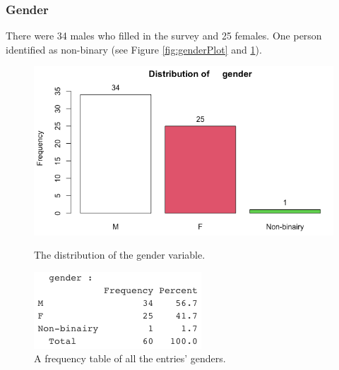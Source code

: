\subsubsection{Gender}
There were 34 males who filled in the survey and 25 females. One person identified as non-binary (see Figure \ref{fig:genderPlot} and \ref{fig:genderFreq}).
\begin{figure}[!htb]
	\includegraphics[width=\linewidth]{../LaTeX/Figures/Environments/GenderPlot.png}
	\caption{The distribution of the gender variable.}\label{fig:genderPlot}
	\endminipage\hfill
	\includegraphics[width=\linewidth]{../LaTeX/Figures/Environments/GenderFreq.png}
	\caption{A frequency table of all the entries' genders.}\label{fig:genderFreq}
	\endminipage\hfill
\end{figure}

